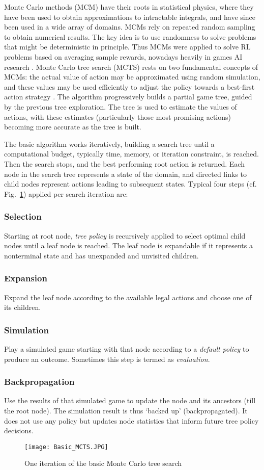 Monte Carlo methods (MCM) have their roots in statistical physics, where they have been used to obtain approximations to intractable integrals\cite{b24}, and have since been used in a wide array of domains. MCMs rely on repeated random sampling to obtain numerical results. The key idea is to use randomness to solve problems that might be deterministic in principle. Thus MCMs were applied to solve RL problems based on averaging sample rewards, nowadays heavily in games AI research \cite{b18,b25}. Monte Carlo tree search (MCTS) rests on two fundamental concepts of MCMs: the actual value of action may be approximated using random simulation, and these values may be used efficiently to adjust the policy towards a best-first action strategy \cite{b18}. The algorithm progressively builds a partial game tree, guided by the previous tree exploration. The tree is used to estimate the values of actions, with these estimates (particularly those most promising actions) becoming more accurate as the tree is built.

The basic algorithm works iteratively, building a search tree until a computational budget, typically time, memory, or iteration constraint, is reached. Then the search stops, and the best performing root action is returned. Each node in the search tree represents a state of the domain, and directed links to child nodes represent actions leading to subsequent states. Typical four steps (cf. Fig.~\ref{basic_MCTS}) applied per search iteration are:
\subsubsection*{Selection} Starting at root node, \textit{tree policy} is recursively applied to select optimal child nodes until a leaf node is reached. The leaf node is expandable if it represents a nonterminal state and has unexpanded and unvisited children.
\subsubsection*{Expansion} Expand the leaf node according to the available legal actions and choose one of its children. 
\subsubsection*{Simulation} Play a simulated game starting with that node according to a \textit{default policy} to produce an outcome. Sometimes this step is termed as \textit{evaluation}. 
\subsubsection*{Backpropagation} Use the results of that simulated game to update the node and its ancestors (till the root node). The simulation result is thus `backed up' (backpropagated). It does not use any policy but updates node statistics that inform future tree policy decisions. 

\begin{figure}[t]
\centerline{\texttt{[image: Basic\_MCTS.JPG]}}
\caption{One iteration of the basic Monte Carlo tree search\cite{b18}}
\label{basic_MCTS}
\end{figure}